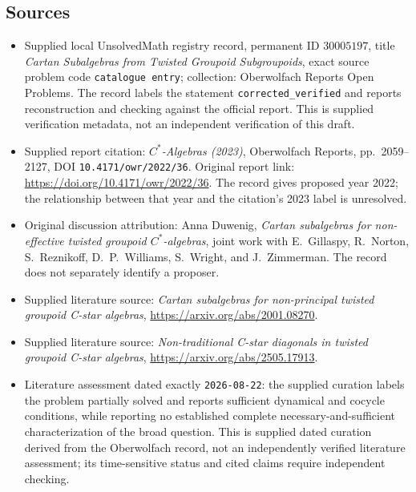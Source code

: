\documentclass[11pt]{article}
\begin{document}
\subsection{Sources}
\begin{itemize}
\item Supplied local UnsolvedMath registry record, permanent ID \(30005197\), title \emph{Cartan Subalgebras from Twisted Groupoid Subgroupoids}, exact source problem code \texttt{catalogue entry}; collection: Oberwolfach Reports Open Problems. The record labels the statement \texttt{corrected\_verified} and reports reconstruction and checking against the official report. This is supplied verification metadata, not an independent verification of this draft.
\item Supplied report citation: \emph{\(C^*\)-Algebras (2023)}, Oberwolfach Reports, pp.\ 2059--2127, DOI \texttt{10.4171/owr/2022/36}. Original report link: \url{https://doi.org/10.4171/owr/2022/36}. The record gives proposed year 2022; the relationship between that year and the citation's 2023 label is unresolved.
\item Original discussion attribution: Anna Duwenig, \emph{Cartan subalgebras for non-effective twisted groupoid \(C^*\)-algebras}, joint work with E.\ Gillaspy, R.\ Norton, S.\ Reznikoff, D.\ P.\ Williams, S.\ Wright, and J.\ Zimmerman. The record does not separately identify a proposer.
\item Supplied literature source: \emph{Cartan subalgebras for non-principal twisted groupoid C-star algebras}, \url{https://arxiv.org/abs/2001.08270}.
\item Supplied literature source: \emph{Non-traditional C-star diagonals in twisted groupoid C-star algebras}, \url{https://arxiv.org/abs/2505.17913}.
\item Literature assessment dated exactly \texttt{2026-08-22}: the supplied curation labels the problem partially solved and reports sufficient dynamical and cocycle conditions, while reporting no established complete necessary-and-sufficient characterization of the broad question. This is supplied dated curation derived from the Oberwolfach record, not an independently verified literature assessment; its time-sensitive status and cited claims require independent checking.
\end{itemize}
\end{document}
